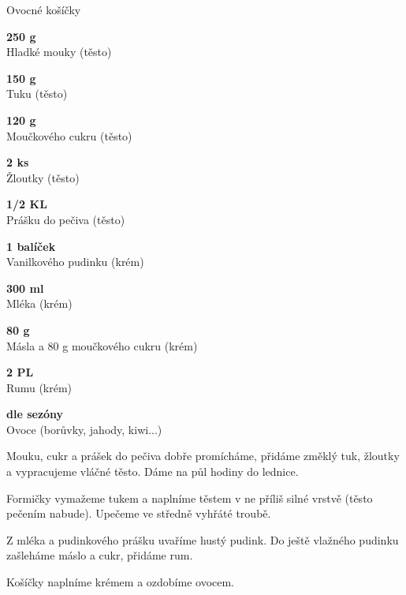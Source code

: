 \documentclass[11pt,a4paper]{article}
\begin{document}
\begin{recipe}[Pink]{Ovocné košíčky}
    \begin{ingredients}
        \item \parbox[t]{\linewidth}{\raggedright \weight \textbf{250 g}\\ Hladké mouky (těsto)}
        \item \parbox[t]{\linewidth}{\raggedright \weight \textbf{150 g}\\ Tuku (těsto)}
        \item \parbox[t]{\linewidth}{\raggedright \weight \textbf{120 g}\\ Moučkového cukru (těsto)}
        \item \parbox[t]{\linewidth}{\raggedright \piece \textbf{2 ks}\\ Žloutky (těsto)}
        \item \parbox[t]{\linewidth}{\raggedright \weight \textbf{1/2 KL}\\ Prášku do pečiva (těsto)}
        \item \parbox[t]{\linewidth}{\raggedright \piece \textbf{1 balíček}\\ Vanilkového pudinku (krém)}
        \item \parbox[t]{\linewidth}{\raggedright \liquid \textbf{300 ml}\\ Mléka (krém)}
        \item \parbox[t]{\linewidth}{\raggedright \weight \textbf{80 g}\\ Másla a 80 g moučkového cukru (krém)}
        \item \parbox[t]{\linewidth}{\raggedright \spoon \textbf{2 PL}\\ Rumu (krém)}
        \item \parbox[t]{\linewidth}{\raggedright \indefinite \textbf{dle sezóny}\\ Ovoce (borůvky, jahody, kiwi...)}
    \end{ingredients}
    \begin{steps}
        \item Mouku, cukr a prášek do pečiva dobře promícháme, přidáme změklý tuk, žloutky a vypracujeme vláčné těsto. Dáme na půl hodiny do lednice.
        \item Formičky vymažeme tukem a naplníme těstem v ne příliš silné vrstvě (těsto pečením nabude). Upečeme ve středně vyhřáté troubě.
        \item Z mléka a pudinkového prášku uvaříme hustý pudink. Do ještě vlažného pudinku zašleháme máslo a cukr, přidáme rum.
        \item Košíčky naplníme krémem a ozdobíme ovocem.
    \end{steps}
\end{recipe}
\end{document}
